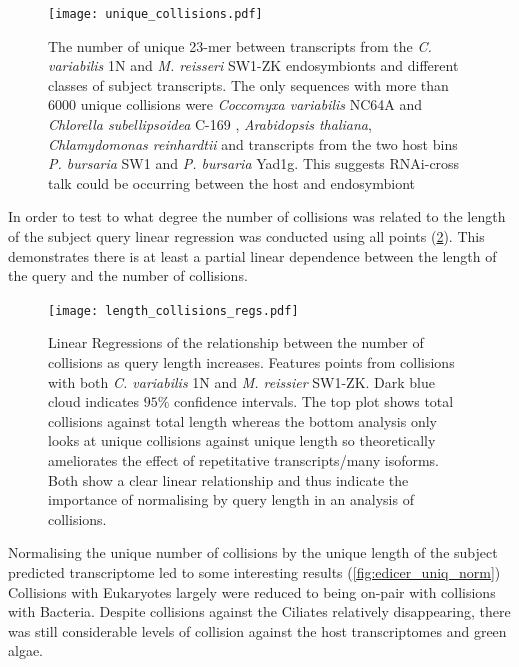 \begin{figure}
    \texttt{[image: unique\_collisions.pdf]}
    \caption[Unique eDicer Collisions by Subject Class]{The number of unique 23-mer
        between transcripts from the \textit{C. variabilis} 1N
    and \textit{M. reisseri} SW1-ZK endosymbionts and different
classes of subject transcripts.  The only sequences with more than 6000
unique collisions were \textit{Coccomyxa variabilis} NC64A and \textit{Chlorella subellipsoidea} C-169
, \textit{Arabidopsis thaliana}, \textit{Chlamydomonas reinhardtii} and transcripts
from the two host bins \textit{P. bursaria} SW1 and \textit{P. bursaria} Yad1g.  
This suggests RNAi-cross talk could be occurring between the host and endosymbiont}
\label{fig:unique_collisions}
\end{figure}

In order to test to what degree the number of collisions was related
to the length of the subject query linear regression was conducted
using all points (\cref{fig:edicer_collisions_by_length}).  This
demonstrates there is at least a partial linear dependence between the 
length of the query and the number of collisions.

\begin{figure}
    \centering
    \texttt{[image: length\_collisions\_regs.pdf]}
    \caption[Regression of eDicer Collisions by Query Length]{Linear Regressions
    of the relationship between the number of collisions as query length
increases. Features points from collisions with both \textit{C. variabilis} 1N
and \textit{M. reissier} SW1-ZK.  Dark blue cloud indicates \(95\%\) confidence
intervals.  
The top plot shows total collisions against
total length whereas the bottom analysis only looks at unique collisions
against unique length so theoretically ameliorates the effect of repetitative 
transcripts/many isoforms.  Both show a clear linear relationship and thus
indicate the importance of normalising by query length in an analysis of 
collisions.}
    \label{fig:edicer_collisions_by_length}
\end{figure}


Normalising the unique number of collisions by the unique length of
the subject predicted transcriptome led to some interesting results (\cref{fig:edicer_uniq_norm})
Collisions with Eukaryotes largely were reduced to being on-pair
with collisions with Bacteria. 
Despite collisions against the Ciliates relatively disappearing,
there was still considerable levels of collision against
the host transcriptomes and green algae.

